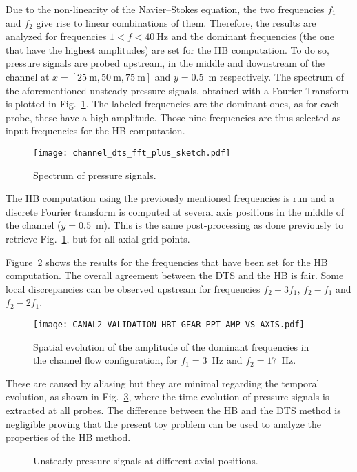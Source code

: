 Due to the non-linearity of the Navier--Stokes equation, the two frequencies
$f_1$ and $f_2$ give rise to linear combinations of them.
Therefore, the results are analyzed for frequencies $1<f< 40~\textrm{Hz}$ and the
dominant frequencies (the one that have the highest amplitudes) are
set for the HB computation.  To do so, pressure signals are probed
upstream, in the middle and downstream of the channel at
$x=[25~\textrm{m}, 50~\textrm{m}, 75~\textrm{m}]$ and $y=0.5$~m
respectively.  The spectrum of the aforementioned unsteady pressure
signals, obtained with a Fourier Transform is plotted in
Fig.~\ref{fig:canal2_dts_fft}.  The labeled frequencies are the
dominant ones, as for each probe, these have a high amplitude. Those
nine frequencies are thus selected as input frequencies for the HB computation.
\begin{figure}
  \centering
  \texttt{[image: channel\_dts\_fft\_plus\_sketch.pdf]}
  \caption{Spectrum of pressure signals.}
  \label{fig:canal2_dts_fft}
\end{figure}

The HB computation using the previously mentioned frequencies is
run and a discrete Fourier transform is computed at several axis positions
in the middle of the channel ($y=0.5$~m). 
This is the same post-processing as done previously to retrieve 
Fig.~\ref{fig:canal2_dts_fft}, but for all axial grid points.

Figure~\ref{fig:canal2_validation_hbt_gear_amp_vs_axis}
shows the results for the frequencies that have been set for the HB computation.
The overall agreement between the DTS and the HB is fair.  
Some local discrepancies can be
observed upstream for frequencies $f_2 + 3f_1$, $f_2 - f_1$ and $f_2 -
2f_1$. 
\begin{figure}
  \centering
  \texttt{[image: CANAL2\_VALIDATION\_HBT\_GEAR\_PPT\_AMP\_VS\_AXIS.pdf]}
  \caption{Spatial evolution of the amplitude of the dominant
    frequencies in the channel flow configuration, for $f_1 = 3$~Hz and $f_2 = 17$~Hz.}
  \label{fig:canal2_validation_hbt_gear_amp_vs_axis}
\end{figure}
These are caused by aliasing
but they are minimal regarding the temporal evolution, as
shown in Fig.~\ref{fig:canal2_validation_hbt_gear_time_ev}, where the
time evolution of pressure signals is extracted at all probes.  The
difference between the HB and the DTS method is negligible proving
that the present toy problem can be used to analyze the properties of 
the HB method.
\begin{figure}
  \centering 
   \quad{}
  \caption{Unsteady pressure signals at different axial positions.}
  \label{fig:canal2_validation_hbt_gear_time_ev}
\end{figure}

